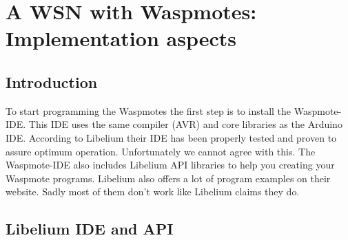 \chapter{A WSN with Waspmotes: Implementation aspects} %
\label{Chapter4} %
\section{Introduction}
To start programming the Waspmotes the first step is to install the Waspmote-IDE. This IDE uses the same compiler (AVR) and core libraries as the Arduino IDE. According to Libelium their IDE has been properly tested and proven to assure optimum operation. Unfortunately we cannot agree with this. The Waspmote-IDE also includes Libelium API libraries to help you creating your Waspmote programs. Libelium also offers a lot of program examples on their website. Sadly most of them don't work like Libelium claims they do.
\section{Libelium IDE and API}
